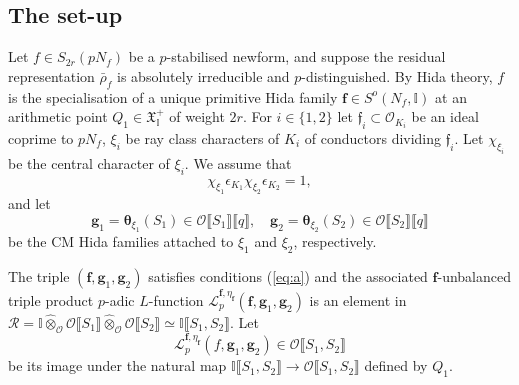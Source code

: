 \documentclass[10pt,letterpaper]{amsart}
\theoremstyle{plain}
\theoremstyle{definition}
\theoremstyle{definition}
\theoremstyle{plain}
\theoremstyle{plain}
\theoremstyle{plain}
\theoremstyle{remark}
\numberwithin{equation}{section}
\newcommand{\ch}{\xi}
\newcommand{\fkf}{\mathfrak{f}}
\def\cO{\mathcal O}
\newcommand{\unb}{{\boldsymbol{f}}}
\newcommand{\dBr}[1]{\llbracket{#1}\rrbracket}
\newcommand{\cR}{\mathbb{I}}
\newcommand{\bff}{{\boldsymbol{f}}}
\newcommand{\bfg}{{\boldsymbol{g}}}
\begin{document}
\subsection{The set-up}\label{subsec:factor-L-def+Sel}

Let $f\in S_{2r}(pN_f)$ be a $p$-stabilised newform, and suppose the residual representation $\bar\rho_f$ is absolutely irreducible and $p$-distinguished. By Hida theory, $f$ is the specialisation of a unique primitive Hida family $\bff\in S^o(N_f,\cR)$ 
at an arithmetic point $Q_1\in\mathfrak{X}_\cR^+$ of weight $2r$.  
For $i\in\{1,2\}$ let $\fkf_i\subset\cO_{K_i}$ be an ideal coprime to $pN_f$, $\ch_i$ be ray class characters of $K_i$ of conductors dividing $\mathfrak{f}_i$. Let $\chi_{\ch_i}$ be the central character of $\ch_i$. We assume that  
\begin{equation}\label{eq:sd-chars}
\chi_{\ch_1}\epsilon_{K_1}\chi_{\ch_2}\epsilon_{K_2}=1,
\end{equation}
and let
\begin{equation}\label{eq:gg*}
\bfg_1=\boldsymbol{\theta}_{\ch_1}(S_1)\in\cO\dBr{S_1}\dBr{q}, 
\quad
\bfg_2=\boldsymbol{\theta}_{\ch_2}(S_2)\in\cO\dBr{S_2}\dBr{q}
\end{equation}
be the CM Hida families %
attached to $\ch_1$ and $\ch_2$, respectively.




The triple $(\bff,\bfg_1,\bfg_2)$ satisfies conditions (\ref{eq:a}) and the associated $\bff$-unbalanced triple product $p$-adic $L$-function $\mathscr{L}_p^{\bff,\eta_{\bff}}(\bff,\bfg_1,\bfg_2)$ %
is an element in $\mathcal{R}=\cR\hat\otimes_{\cO}\cO\dBr{S_1}\hat\otimes_{\cO}\cO\dBr{S_2}\simeq\cR\dBr{S_1,S_2}$. Let 
\begin{equation}\label{eq:triple-2var}
\mathscr{L}_p^{\unb,\eta_\bff}(f,\bfg_1,\bfg_2)\in\cO\dBr{S_1,S_2}
\end{equation}
be its image  
under the natural map $\cR\dBr{S_1,S_2}\rightarrow\cO\dBr{S_1,S_2}$ defined by $Q_1$.
\end{document}
